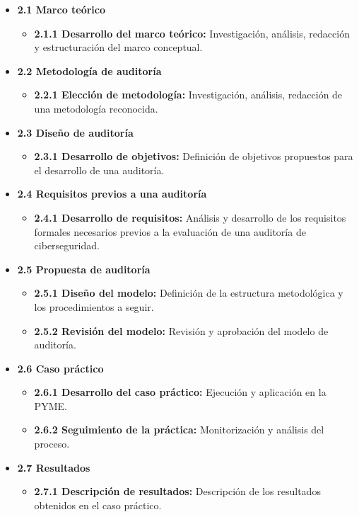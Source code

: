 \documentclass[a4paper, 10pt]{article}
\begin{document}
\begin{itemize}
    \item \textbf{2.1 Marco teórico}
    \begin{itemize}
        \item \textbf{2.1.1 Desarrollo del marco teórico:} Investigación, análisis, redacción y estructuración del marco conceptual.
    \end{itemize}

    \item \textbf{2.2 Metodología de auditoría}
    \begin{itemize}
        \item \textbf{2.2.1 Elección de metodología:} Investigación, análisis, redacción de una metodología reconocida.
    \end{itemize}


    \item \textbf{2.3 Diseño de auditoría}
    \begin{itemize}
        \item \textbf{2.3.1 Desarrollo de objetivos:} Definición de objetivos propuestos para el desarrollo de una auditoría.
    \end{itemize}

      \item \textbf{2.4 Requisitos previos a una auditoría}
    \begin{itemize}
        \item \textbf{2.4.1 Desarrollo de requisitos:} Análisis y desarrollo de los requisitos formales necesarios previos a la evaluación de una auditoría de ciberseguridad.
    \end{itemize}

    \item \textbf{2.5 Propuesta de auditoría}
    \begin{itemize}
        \item \textbf{2.5.1 Diseño del modelo:} Definición de la estructura metodológica y los procedimientos a seguir.
        \item \textbf{2.5.2 Revisión del modelo:} Revisión y aprobación del modelo de auditoría.
    \end{itemize}

    \item \textbf{2.6 Caso práctico}
    \begin{itemize}
        \item \textbf{2.6.1 Desarrollo del caso práctico:} Ejecución y aplicación en la PYME.
        \item \textbf{2.6.2 Seguimiento de la práctica:} Monitorización y análisis del proceso.
    \end{itemize}


   \item \textbf{2.7 Resultados}
    \begin{itemize}
        \item \textbf{2.7.1 Descripción de resultados:} Descripción de los resultados obtenidos en el caso práctico.
    \end{itemize}
\end{itemize}
\end{document}
